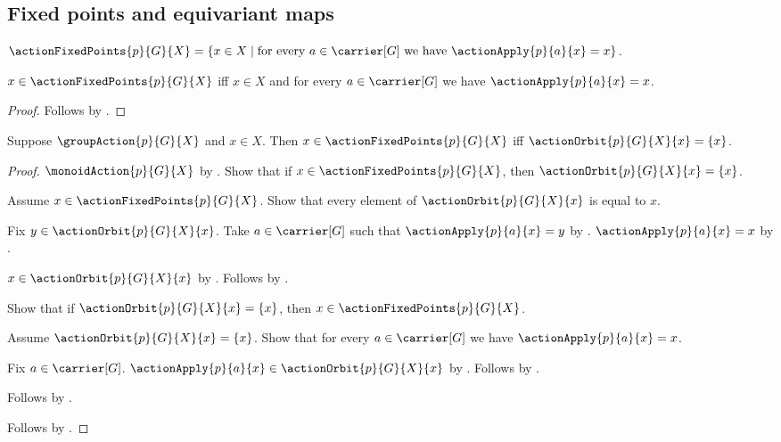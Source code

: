 \subsection{Fixed points and equivariant maps}

\begin{definition}\label{action_fixed_points}
    $\actionFixedPoints{p}{G}{X}=
        \{x\in X\mid
            \text{for every $a\in\carrier[G]$ we have
                $\actionApply{p}{a}{x}=x$}\}$.
\end{definition}

\begin{proposition}\label{action_fixed_points_iff}
    $x\in\actionFixedPoints{p}{G}{X}$ iff
        $x\in X$ and for every $a\in\carrier[G]$ we have
            $\actionApply{p}{a}{x}=x$.
\end{proposition}
\begin{proof}
    Follows by .
\end{proof}

\begin{proposition}\label{group_action_fixed_iff_singleton_orbit}
    Suppose $\groupAction{p}{G}{X}$ and $x\in X$.
    Then $x\in\actionFixedPoints{p}{G}{X}$ iff
        $\actionOrbit{p}{G}{X}{x}=\{x\}$.
\end{proposition}
\begin{proof}
    $\monoidAction{p}{G}{X}$ by
        .
    Show that if $x\in\actionFixedPoints{p}{G}{X}$, then
        $\actionOrbit{p}{G}{X}{x}=\{x\}$.
    \begin{subproof}
        Assume $x\in\actionFixedPoints{p}{G}{X}$.
        Show that every element of $\actionOrbit{p}{G}{X}{x}$
            is equal to $x$.
        \begin{subproof}
            Fix $y\in\actionOrbit{p}{G}{X}{x}$.
            Take $a\in\carrier[G]$ such that
                $\actionApply{p}{a}{x}=y$ by .
            $\actionApply{p}{a}{x}=x$ by
                .
        \end{subproof}
        $x\in\actionOrbit{p}{G}{X}{x}$ by
            .
        Follows by .
    \end{subproof}
    Show that if $\actionOrbit{p}{G}{X}{x}=\{x\}$, then
        $x\in\actionFixedPoints{p}{G}{X}$.
    \begin{subproof}
        Assume $\actionOrbit{p}{G}{X}{x}=\{x\}$.
        Show that for every $a\in\carrier[G]$ we have
            $\actionApply{p}{a}{x}=x$.
        \begin{subproof}
            Fix $a\in\carrier[G]$.
            $\actionApply{p}{a}{x}\in\actionOrbit{p}{G}{X}{x}$ by
                .
            Follows by .
        \end{subproof}
        Follows by .
    \end{subproof}
    Follows by \auto.
\end{proof}


